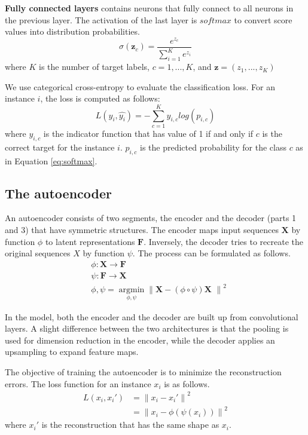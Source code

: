 \textbf{Fully connected layers} contains neurons that fully connect to all neurons in the previous layer. The activation of the last layer is $softmax$ to convert score values into distribution probabilities.
    \begin{equation}
    \label{eq:softmax}
        \sigma(\textbf{z}_c) = \frac{e^{z_c}}{\sum_{i = 1}^{K}{e^{z_i}}}
    \end{equation}
    where $K$ is the number of target labels, $c = 1, ..., K$, and $\textbf{z} = (z_1, ..., z_K)$

We use categorical cross-entropy to evaluate the classification loss. For an instance $i$, the loss is computed as follows:
    \begin{equation}
    \label{eq:loss_classification}
        L(y_i, \hat{y_i}) = -\sum_{c=1}^{K}{y_{i,c}log(p_{i,c})}
    \end{equation}{}
    where $y_{i,c}$ is the indicator function that has value of 1 if and only if $c$ is the correct target for the instance $i$. $p_{i,c}$ is the predicted probability for the class $c$ as in Equation \ref{eq:softmax}.
\subsection{The autoencoder}
An autoencoder consists of two segments, the encoder and the decoder (parts 1 and 3) that have symmetric structures. The encoder maps input sequences $\textbf{X}$ by function $\phi$ to latent representations $\textbf{F}$. Inversely, the decoder tries to recreate the original sequences $X$ by function $\psi$. The process can be formulated as follows.
    \begin{equation}
    \begin{split}
        &\phi : \textbf{X} \rightarrow \textbf{F} \\
        &\psi : \textbf{F} \rightarrow \textbf{X} \\
        &\phi, \psi = \underset{\phi, \psi}{\operatorname{argmin}}\left \| \textbf{X} - (\phi \circ  \psi)\textbf{X } \right \|^2    
    \end{split}
    \end{equation}

In the model, both the encoder and the decoder are built up from convolutional layers. A slight difference between the two architectures is that the pooling is used for dimension reduction in the encoder, while the decoder applies an upsampling to expand feature maps. 

The objective of training the autoencoder is to minimize the reconstruction errors. The loss function for an instance $x_i$ is as follows.
    \begin{equation}
    \label{eq:loss_reconstruction}
     \begin{split}
         L(x_i, {x_i}') &= \left \| x_i - {x_i}' \right \|^2 \\
                  &= \left \| x_i - \phi(\psi(x_i)) \right \|^2
    \end{split}
    \end{equation}
    where ${x_i}'$ is the reconstruction that has the same shape as $x_i$.
    

